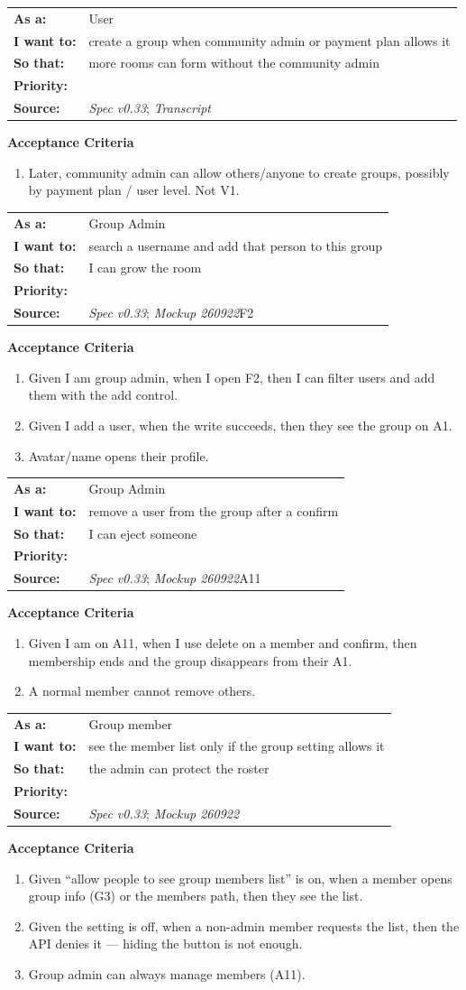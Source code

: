 \documentclass[11pt,a4paper]{article}
\makeatletter
\newcommand{\priPzero}{\colorbox{p0}{\makebox[4.6em]{\textcolor{white}{\scriptsize\bfseries P0 V1}}}}
\newcommand{\priPtwo}{\colorbox{p2}{\makebox[4.6em]{\textcolor{white}{\scriptsize\bfseries P2 Later}}}}
\newcommand{\srcSpec}{\textit{Spec v0.33}}
\newcommand{\srcTx}{\textit{Transcript}}
\newcommand{\srcMock}{\textit{Mockup 260922}}
\newenvironment{story}[1]{%
  \Needspace{10\baselineskip}%
  \vspace{0.7em}%
  \noindent
  \colorbox{navy}{\makebox[\dimexpr\textwidth-2\fboxsep\relax][l]{\textcolor{white}{\bfseries\ #1}}}%
  \par\vspace{0.35em}%
}{\par\vspace{0.55em}}
\newcommand{\storymeta}[5]{%
  \noindent
  \begin{tabularx}{\textwidth}{@{}>{\bfseries}l X@{}}
    As a: & #1 \\
    I want to: & #2 \\
    So that: & #3 \\
    Priority: & #4 \\
    Source: & #5 \\
  \end{tabularx}
  \par\vspace{0.3em}
}
\newcommand{\achead}{\noindent\textbf{Acceptance Criteria}\par}
\makeatother
\begin{document}
\begin{story}{GROUP-003 --- Users may create groups later}
\storymeta{User}{create a group when community admin or payment plan allows it}{more rooms can form without the community admin}{\priPtwo}{\srcSpec; \srcTx}
\achead
\begin{enumerate}
  \item Later, community admin can allow others/anyone to create groups, possibly by payment plan / user level. Not V1.
\end{enumerate}
\end{story}

\begin{story}{GROUP-004 --- Add members by username search}
\storymeta{Group Admin}{search a username and add that person to this group}{I can grow the room}{\priPzero}{\srcSpec; \srcMock F2}
\achead
\begin{enumerate}
  \item Given I am group admin, when I open F2, then I can filter users and add them with the add control.
  \item Given I add a user, when the write succeeds, then they see the group on A1.
  \item Avatar/name opens their profile.
\end{enumerate}
\end{story}

\begin{story}{GROUP-005 --- Remove a member}
\storymeta{Group Admin}{remove a user from the group after a confirm}{I can eject someone}{\priPzero}{\srcSpec; \srcMock A11}
\achead
\begin{enumerate}
  \item Given I am on A11, when I use delete on a member and confirm, then membership ends and the group disappears from their A1.
  \item A normal member cannot remove others.
\end{enumerate}
\end{story}

\begin{story}{GROUP-006 --- Member list visibility}
\storymeta{Group member}{see the member list only if the group setting allows it}{the admin can protect the roster}{\priPzero}{\srcSpec; \srcMock}
\achead
\begin{enumerate}
  \item Given ``allow people to see group members list'' is on, when a member opens group info (G3) or the members path, then they see the list.
  \item Given the setting is off, when a non-admin member requests the list, then the API denies it --- hiding the button is not enough.
  \item Group admin can always manage members (A11).
\end{enumerate}
\end{story}
\end{document}
